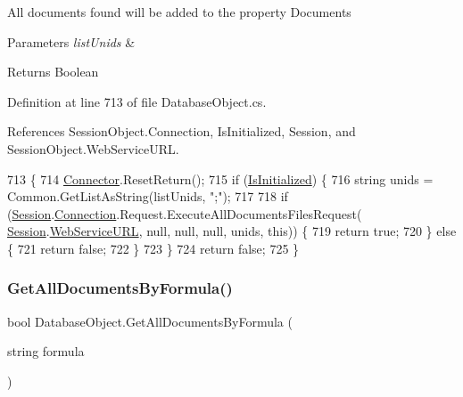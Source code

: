 All documents found will be added to the property \textquotesingle{}Documents\textquotesingle{}


\begin{DoxyParams}{Parameters}
{\em list\+Unids} & \\
\hline
\end{DoxyParams}
\begin{DoxyReturn}{Returns}
Boolean
\end{DoxyReturn}


Definition at line 713 of file Database\+Object.\+cs.



References Session\+Object.\+Connection, Is\+Initialized, Session, and Session\+Object.\+Web\+Service\+U\+RL.


\begin{DoxyCode}
713                                                                 \{
714         \mbox{\hyperlink{class_connector}{Connector}}.ResetReturn();
715         \textcolor{keywordflow}{if} (\mbox{\hyperlink{class_database_object_a5fe036d32a30eb10d1b3f6a30263f740}{IsInitialized}}) \{
716             \textcolor{keywordtype}{string} unids = Common.GetListAsString(listUnids, \textcolor{stringliteral}{";"});
717 
718             \textcolor{keywordflow}{if} (\mbox{\hyperlink{class_database_object_aa8484162b7d2a7c4c9426bca13c64c07}{Session}}.\mbox{\hyperlink{class_session_object_a014bdbf705a753540e19bfb53030c55c}{Connection}}.Request.ExecuteAllDocumentsFilesRequest(
      \mbox{\hyperlink{class_database_object_aa8484162b7d2a7c4c9426bca13c64c07}{Session}}.\mbox{\hyperlink{class_session_object_a697c071c812fbf7ad1166b896fb44c16}{WebServiceURL}}, null, null, null, unids, \textcolor{keyword}{this})) \{
719                 \textcolor{keywordflow}{return} \textcolor{keyword}{true};
720             \} \textcolor{keywordflow}{else} \{
721                 \textcolor{keywordflow}{return} \textcolor{keyword}{false};
722             \}
723         \}
724         \textcolor{keywordflow}{return} \textcolor{keyword}{false};
725     \}
\end{DoxyCode}
\mbox{\label{class_database_object_a6bfb480373a7e2bdbeaa67e4e3303a3a}} 
\subsubsection{\texorpdfstring{Get\+All\+Documents\+By\+Formula()}{GetAllDocumentsByFormula()}}
{\footnotesize\ttfamily bool Database\+Object.\+Get\+All\+Documents\+By\+Formula (\begin{DoxyParamCaption}\item[{string}]{formula }\end{DoxyParamCaption})}



